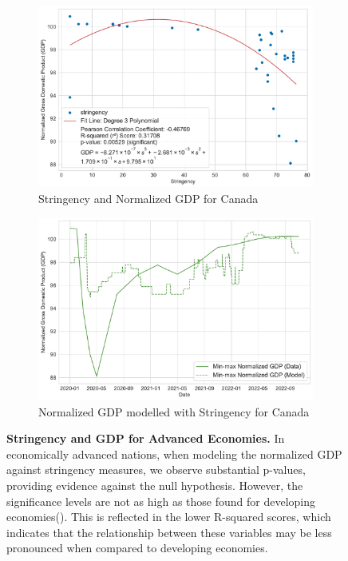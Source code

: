 \documentclass[tikz,fleqn,12pt]{wlscirep}
\begin{document}
\begin{figure}[htbp!]
  \begin{subfigure}[t]{0.48\textwidth}
    \centering
    \includegraphics[width=\linewidth]{images/stringency_vs_gdp_CAN.pdf}
    \caption{Stringency and Normalized GDP for Canada}
  \end{subfigure}
  \label{fig:stringency_vs_gdp_CAN}
  \hfill
  \begin{subfigure}[t]{0.48\textwidth}
    \centering
    \includegraphics[width=\linewidth]{images/gdp_modelled_with_stringency_CAN.pdf}
    \caption{Normalized GDP modelled with Stringency for Canada}
  \end{subfigure}
  \label{fig:gdp_modelled_with_stringency_CAN}
  \caption{\textbf{Stringency and GDP for Advanced Economies.} In economically advanced nations, when modeling the normalized GDP against stringency measures, we observe substantial p-values, providing evidence against the null hypothesis. However, the significance levels are not as high as those found for developing economies(). This is reflected in the lower R-squared scores, which indicates that the relationship between these variables may be less pronounced when compared to developing economies.}
\end{figure}
\end{document}
